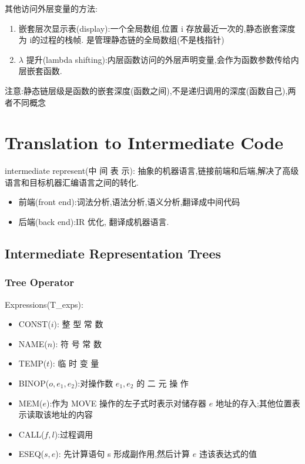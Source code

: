 其他访问外层变量的方法:
\begin{enumerate}
    \item 嵌套层次显示表(display):一个全局数组,位置 i 存放最近一次的,静态嵌套深度为 i的过程的栈帧. 是管理静态链的全局数组(不是栈指针) 
    \item $\lambda$ 提升(lambda shifting):内层函数访问的外层声明变量,会作为函数参数传给内层嵌套函数.
\end{enumerate}

注意:静态链层级是函数的嵌套深度(函数之间),不是递归调用的深度(函数自己),两者不同概念

\newpage
\section{Translation to Intermediate Code}
intermediate represent(中 间 表 示): 抽象的机器语言,链接前端和后端,解决了高级语言和目标机器汇编语言之间的转化.

\begin{itemize}
    \item 前端(front end):词法分析,语法分析,语义分析,翻译成中间代码
    \item 后端(back end):IR 优化, 翻译成机器语言.
\end{itemize}

\subsection{Intermediate Representation Trees}
\subsubsection{Tree Operator}

Expressions(T\_exps): 
\begin{itemize}
    \item CONST($i$): 整 型 常 数 
    \item NAME($n$): 符 号 常 数 
    \item TEMP($t$): 临 时 变 量 
    \item BINOP($o, e_1, e_2$):对操作数 $e_1,e_2$ 的 二 元 操 作 
    \item MEM($e$):作为 MOVE 操作的左子式时表示对储存器 $e$ 地址的存入;其他位置表示读取该地址的内容 
    \item CALL($f,l$):过程调用 
    \item ESEQ($s,e$): 先计算语句 s 形成副作用,然后计算 $e$ 违该表达式的值 
\end{itemize}

